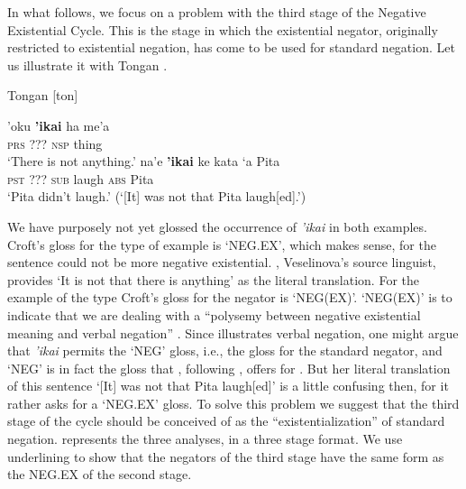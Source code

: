 ﻿\documentclass[output=paper,draft,draftmode,colorlinks,citecolor=brown]{langscibook}
\begin{document}
In what follows, we focus on a problem with the third stage of the Negative
Existential Cycle. This is the stage in which the existential negator,
originally restricted to existential negation, has come to be used for
standard negation. Let us illustrate it with Tongan 
\parencites(cp.)()[12]{Croft1991}[1342]{Veselinova2014}. 
%
\begin{exe}\ex\label{ex:int-tongan-anything-laugh}
          Tongan [ton] 
          \begin{xlist}
    \ex\label{ex:int-tongan-anything}
    \gll 'oku  \textbf{'ikai}  ha  me'a \\
    \textsc{prs}  ???  \textsc{nsp}  thing \\
    \glt `There is not anything.'
    \ex\label{ex:int-tongan-laugh}
    \gll na'e  \textbf{'ikai}  ke  kata  `a  Pita\\
\textsc{pst}  ???  \textsc{sub}  laugh  \textsc{abs}  Pita\\
    \glt `Pita didn't laugh.' (`[It] was not that Pita laugh[ed].')
    \end{xlist}\end{exe}
%
We have purposely not yet glossed the occurrence of \textit{'ikai} in
both examples. Croft's gloss for the  type of example is
`NEG.EX', which makes sense, for the sentence could not be more negative
existential. \textcite[101]{Broschart1999}, Veselinova's source linguist,
provides `It is not that there is anything' as the literal translation. For
the example of the  type Croft's gloss for the negator is
`NEG(EX)'. `NEG(EX)' is to indicate that we are dealing with a ``polysemy
between negative existential meaning and verbal negation''
\parencite[12]{Croft1991}. Since  illustrates verbal negation,
one might argue that \textit{'ikai} permits the `NEG' gloss, i.e., the
gloss for the standard negator, and `NEG' is in fact the gloss that
\textcite[1342]{Veselinova2014}, following \textcite[104]{Broschart1999}, offers
for . But her literal translation of this sentence `[It]
was not that Pita laugh[ed]' \parencite[in line again with][104]{Broschart1999}
 is a little confusing then, for it rather asks for a `NEG.EX' gloss.
To solve this problem we suggest that the third stage of the cycle should
be conceived of as the ``existentialization'' of standard negation.
 represents the three analyses, in a three stage format.
We use underlining  to show that the negators of the third stage have the same
form as the NEG.EX of the second stage.
\end{document}
